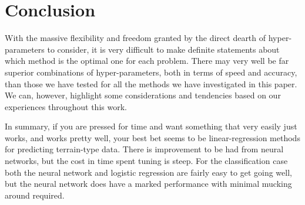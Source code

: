 \documentclass[reprint, english, nofootinbib]{revtex4-2}
\begin{document}


\section{Conclusion}

\noindent
With the massive flexibility and freedom granted by the direct dearth of hyper-parameters to consider, it is very difficult to make definite statements about which method is the optimal one for each problem. There may very well be far superior combinations of hyper-parameters, both in terms of speed and accuracy, than those we have tested for all the methods we have investigated in this paper. We can, however, highlight some considerations and tendencies based on our experiences throughout this work.



In summary, if you are pressed for time and want something that very easily just works, and works pretty well, your best bet seems to be linear-regression methods for predicting terrain-type data. There is improvement to be had from neural networks, but the cost in time spent tuning is steep. For the classification case both the neural network and logistic regression are fairly easy to get going well, but the neural network does have a marked performance with minimal mucking around required.


\onecolumngrid

\newpage
\twocolumngrid
\appendix
\end{document}

